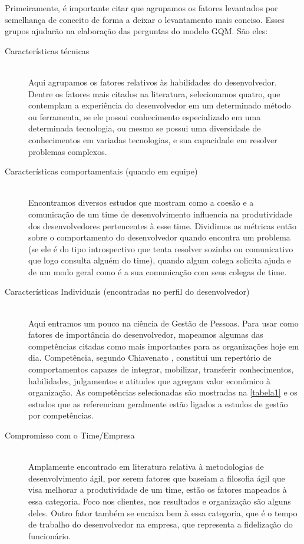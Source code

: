 Primeiramente, é importante citar que agrupamos os fatores levantados por semelhança de conceito de forma a deixar o levantamento mais conciso. Esses grupos ajudarão na elaboração das perguntas do modelo GQM. São eles:


\begin{description}
	\item[Características técnicas] \hfill \\
	Aqui agrupamos os fatores relativos às habilidades do desenvolvedor. Dentre os fatores mais citados na literatura, selecionamos quatro, que contemplam a experiência do desenvolvedor em um determinado método ou ferramenta, se ele possui conhecimento especializado em uma determinada tecnologia, ou mesmo se possui uma diversidade de conhecimentos em variadas tecnologias, e sua capacidade em resolver problemas complexos.
	
	\item[Características comportamentais (quando em equipe)] \hfill \\
	Encontramos diversos estudos que mostram como a coesão e a comunicação de um time de desenvolvimento influencia na produtividade dos desenvolvedores pertencentes à esse time. Dividimos as métricas então sobre o comportamento do desenvolvedor quando encontra um problema (se ele é do tipo introspectivo que tenta resolver sozinho ou comunicativo que logo consulta alguém do time), quando algum colega solicita ajuda e de um modo geral como é a sua comunicação com seus colegas de time.
	
	\item[Características Individuais (encontradas no perfil do desenvolvedor)] \hfill \\
	Aqui entramos um pouco na ciência de Gestão de Pessoas. Para usar como fatores de importância do desenvolvedor, mapeamos algumas das competências citadas como  mais importantes para as organizações hoje em dia. Competência, segundo Chiavenato \cite{Chiavenato2008}, constitui um repertório de comportamentos capazes de integrar, mobilizar, transferir conhecimentos, habilidades, julgamentos e atitudes que agregam valor econômico à organização. As competências selecionadas são mostradas na \autoref{tabela1} e os estudos que as referenciam geralmente estão ligados a estudos de gestão por competências.
	
	\item[Compromisso com o Time/Empresa] \hfill \\
	Amplamente encontrado em literatura relativa à metodologias de desenvolvimento ágil,  por serem fatores que baseiam a filosofia ágil que visa melhorar a produtividade de um time, estão os fatores mapeados à essa categoria. Foco nos clientes, nos resultados e organização são alguns deles. Outro fator também se encaixa bem à essa categoria, que é o tempo de trabalho do desenvolvedor na empresa, que representa a fidelização do funcionário.
	
\end{description}

